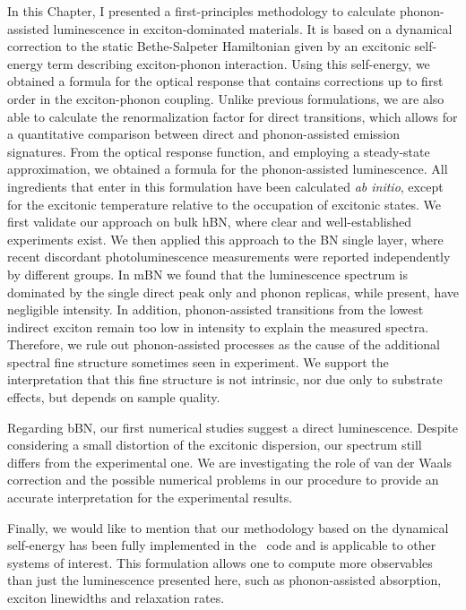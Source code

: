 In this Chapter, I presented a first-principles methodology to calculate phonon-assisted luminescence in exciton-dominated materials. It is based on a dynamical correction to the static Bethe-Salpeter Hamiltonian given by an excitonic self-energy term describing exciton-phonon interaction. Using this self-energy, we obtained a formula for the optical response that contains corrections up to first order in the exciton-phonon coupling.
Unlike previous formulations, we are also able to calculate the renormalization factor for direct transitions, which allows for a quantitative comparison between direct and phonon-assisted emission signatures.
From the optical response function, and employing a steady-state approximation, we obtained a formula for the phonon-assisted luminescence. All ingredients that enter in this formulation have been calculated \emph{ab initio}, except for the excitonic temperature relative to the occupation of excitonic states.
We first validate our approach on bulk \acrshort{hBN}, where clear and well-established experiments exist. We then applied this approach to the BN single layer, where recent discordant photoluminescence measurements were reported independently by different groups. In mBN we found that the luminescence spectrum is dominated by the single direct peak only and phonon replicas, while present, have negligible intensity. In addition, 
phonon-assisted transitions from the lowest indirect exciton remain too low in intensity to explain the measured spectra. Therefore, we rule out phonon-assisted processes as the cause of the additional spectral fine structure sometimes seen in experiment.
We support the interpretation that this fine structure is not intrinsic, nor due only to substrate effects, but depends on sample quality.

Regarding \acrshort{bBN}, our first numerical studies suggest a direct luminescence. Despite considering a small distortion of the excitonic dispersion, our spectrum still differs from the experimental one. We are investigating the role of van der Waals correction and the possible numerical problems in our procedure to provide an accurate interpretation for the experimental results.

Finally, we would like to mention that our methodology based on the dynamical self-energy has been fully implemented in the \yambo~code and is applicable to other systems of interest. This formulation allows one to compute more observables than just the luminescence presented here, such as phonon-assisted absorption, exciton linewidths and relaxation rates. \\

